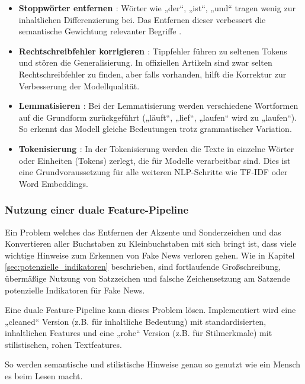\begin{itemize}
    \item \textbf{Stoppwörter entfernen \cite{Buddhadev2025} \cite{sabir2025} \cite{aslam2022}}: Wörter wie „der“, „ist“, „und“ tragen wenig zur inhaltlichen Differenzierung bei. 
    Das Entfernen dieser verbessert die semantische Gewichtung relevanter Begriffe \cite{sarkar2018nlpguide}.

    \item \textbf{Rechtschreibfehler korrigieren \cite{sabir2025}}: Tippfehler führen zu seltenen Tokens und stören die Generalisierung. 
    In offiziellen Artikeln sind zwar selten Rechtschreibfehler zu finden, aber falls vorhanden, hilft die Korrektur zur Verbesserung
    der Modellqualität.

    \item \textbf{Lemmatisieren \cite{Buddhadev2025} \cite{sabir2025} \cite{aslam2022}}: Bei der Lemmatisierung werden verschiedene Wortformen auf die Grundform zurückgeführt 
    („läuft“, „lief“, „laufen“ wird zu „laufen“). So erkennt das Modell gleiche Bedeutungen trotz grammatischer Variation.

    \item \textbf{Tokenisierung \cite{sabir2025}}: In der Tokenisierung werden die Texte in einzelne Wörter oder Einheiten (Tokens) zerlegt, die für Modelle verarbeitbar sind. 
    Dies ist eine Grundvoraussetzung für alle weiteren NLP-Schritte wie TF-IDF oder Word Embeddings.
\end{itemize}

\subsubsection{Nutzung einer duale Feature-Pipeline}

Ein Problem welches das Entfernen der Akzente und Sonderzeichen und das Konvertieren aller Buchstaben zu Kleinbuchstaben mit sich bringt
ist, dass viele wichtige Hinweise zum Erkennen von Fake News verloren gehen. Wie in Kapitel \ref{sec:potenzielle_indikatoren} beschrieben,
sind fortlaufende Großschreibung, übermäßige Nutzung von Satzzeichen und falsche Zeichensetzung am Satzende potenzielle Indikatoren für Fake News.

Eine duale Feature-Pipeline kann dieses Problem lösen. Implementiert wird eine „cleaned“ Version (z.B. für inhaltliche Bedeutung) mit 
standardisierten, inhaltlichen Features und eine „rohe“ Version (z.B. für Stilmerkmale) mit stilistischen, rohen Textfeatures.

So werden semantische und stilistische Hinweise genau so genutzt wie ein Mensch es beim Lesen macht.

